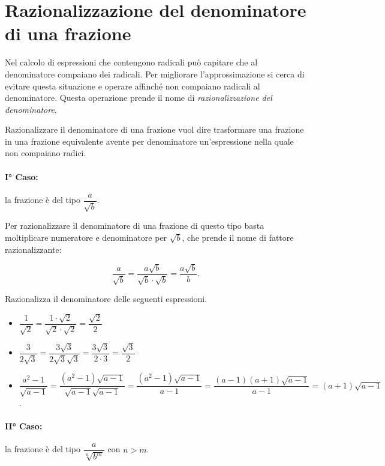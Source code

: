
\section{Razionalizzazione del denominatore di una frazione}
\label{sec:02_razionalizzazione}

Nel calcolo di espressioni che contengono radicali può capitare che al 
denominatore compaiano dei radicali. 
Per migliorare l'approssimazione si cerca di evitare questa situazione e 
operare affinché non compaiano radicali al denominatore. 
Questa operazione prende il nome di \emph{razionalizzazione del denominatore}.

Razionalizzare il denominatore di una frazione vuol dire trasformare una 
frazione in una frazione equivalente avente per denominatore un'espressione 
nella quale non compaiano radici.

\paragraph{I° Caso:} la frazione è del tipo \(\dfrac a{\sqrt b}\).

Per razionalizzare il denominatore di una frazione di questo tipo basta 
moltiplicare numeratore e denominatore per \(\sqrt b\), che prende il nome di 
fattore razionalizzante: 

\[\dfrac {a} {\sqrt b} = \dfrac{a\sqrt b}{\sqrt b\cdot \sqrt b}=
  \dfrac{a\sqrt b}b.\]

\begin{exrig}
 \begin{esempio}
Razionalizza il denominatore delle seguenti espressioni.
\begin{itemize}
 \item \(\dfrac 1{\sqrt 2}=\dfrac{1\cdot \sqrt 2}{\sqrt 2\cdot \sqrt 2}=
        \dfrac{\sqrt 2} 2\)
 \item \(\dfrac 3{2\sqrt 3}=\dfrac{3\sqrt 3}{2\sqrt 3\sqrt 3}=
        \dfrac{3\sqrt 3}{2\cdot 3}=\dfrac{\sqrt 3} 2\)
 \item \(\dfrac{a^2-1}{\sqrt{a-1}}=
        \dfrac{(a^2-1)\sqrt{a-1}}{\sqrt{a-1}\sqrt{a-1}}=
        \dfrac{(a^2-1)\sqrt{a-1}}{a-1}=
        \dfrac{(a-1)(a+1)\sqrt{a-1}}{a-1}=(a+1)\sqrt{a-1}\).
\end{itemize}
 \end{esempio}
\end{exrig}

\paragraph{II° Caso:}
 la frazione è del tipo \(\dfrac a{\sqrt[n]{b^m}}\) con \(n>m\).

